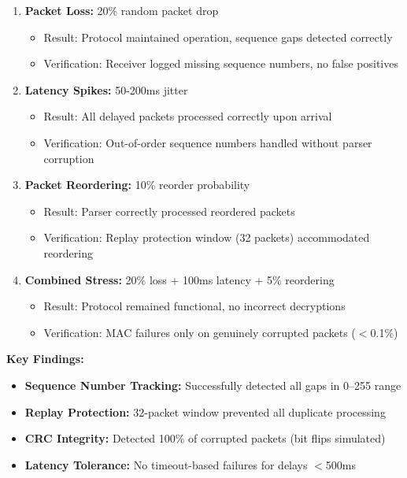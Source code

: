 \documentclass[11pt,a4paper]{article}
\begin{document}
\begin{enumerate}[noitemsep]
    \item \textbf{Packet Loss:} 20\% random packet drop
    \begin{itemize}[noitemsep]
        \item Result: Protocol maintained operation, sequence gaps detected correctly
        \item Verification: Receiver logged missing sequence numbers, no false positives
    \end{itemize}
    
    \item \textbf{Latency Spikes:} 50-200ms jitter
    \begin{itemize}[noitemsep]
        \item Result: All delayed packets processed correctly upon arrival
        \item Verification: Out-of-order sequence numbers handled without parser corruption
    \end{itemize}
    
    \item \textbf{Packet Reordering:} 10\% reorder probability
    \begin{itemize}[noitemsep]
        \item Result: Parser correctly processed reordered packets
        \item Verification: Replay protection window (32 packets) accommodated reordering
    \end{itemize}
    
    \item \textbf{Combined Stress:} 20\% loss + 100ms latency + 5\% reordering
    \begin{itemize}[noitemsep]
        \item Result: Protocol remained functional, no incorrect decryptions
        \item Verification: MAC failures only on genuinely corrupted packets ($<$0.1\%)
    \end{itemize}
\end{enumerate}

\textbf{Key Findings:}
\begin{itemize}[noitemsep]
    \item \textbf{Sequence Number Tracking:} Successfully detected all gaps in 0--255 range
    \item \textbf{Replay Protection:} 32-packet window prevented all duplicate processing
    \item \textbf{CRC Integrity:} Detected 100\% of corrupted packets (bit flips simulated)
    \item \textbf{Latency Tolerance:} No timeout-based failures for delays $<$500ms
\end{itemize}
\end{document}
